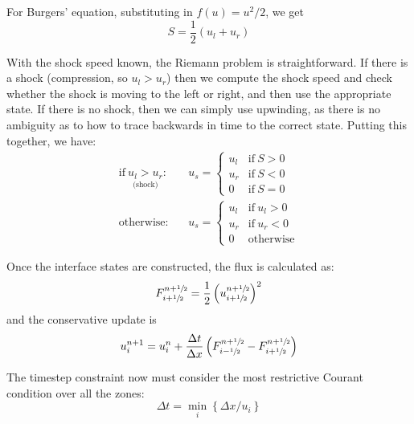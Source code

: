 For Burgers' equation, substituting in $f(u) = u^2/2$, we get
\begin{equation}
S = \frac{1}{2}(u_l + u_r)
\end{equation}

With the shock speed known, the Riemann problem is straightforward.  If there
is a shock (compression, so $u_l > u_r$) then we compute the shock speed and
check whether the shock is moving to the left or right, and then use the appropriate
state.  If there is no shock, then we can simply use upwinding, as there is no
ambiguity as to how to trace backwards in time to the correct state.
Putting this together, we have:
\begin{eqnarray}
\mathrm{if~} \underset{\text{(shock)}}{u_l > u_r}:&& u_s = \left \{ \begin{array}{cl}
                u_l & \mathrm{if~} S > 0 \\
                u_r & \mathrm{if~} S < 0 \\
                0   & \mathrm{if~} S = 0 \end{array} \right .   \\[1em]
%
\mathrm{otherwise:}&& u_s = \left \{ \begin{array}{clc}
                u_l & \mathrm{if~} u_l > 0 \\
                u_r & \mathrm{if~} u_r < 0 \\
                0   & \mathrm{otherwise} \end{array} \right .
\end{eqnarray}

Once the interface states are constructed, the flux is calculated as:
\begin{equation}
F^{n+{\sfrac{1}{2}}}_{i+{\sfrac{1}{2}}} = \frac{1}{2} \left (u_{i+{\sfrac{1}{2}}}^{n+{\sfrac{1}{2}}} \right )^2
\end{equation}
and the conservative update is
\begin{equation}
u_i^{n+1} = u_i^n + \frac{\Delta t}{\Delta x}
   \left ( F_{i-{\sfrac{1}{2}}}^{n+{\sfrac{1}{2}}} - F_{i+{\sfrac{1}{2}}}^{n+{\sfrac{1}{2}}} \right )
\end{equation}

The timestep constraint now must consider the most restrictive Courant
condition over all the zones:
\begin{equation}
\Delta t = \min_i \left \{ \Delta x / u_i \right \}
\end{equation}


